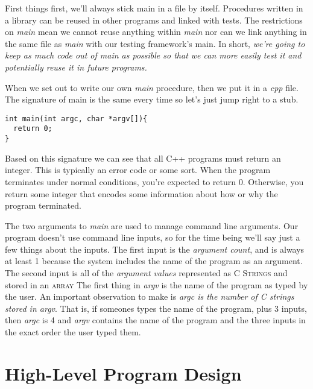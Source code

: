 \documentclass[]{tufte-handout}
\begin{document}
First things first, we'll always stick main in a file by itself. Procedures written in a library can be reused in other programs and linked with tests.  The restrictions on \textit{main} mean we cannot reuse anything within \textit{main} nor can we link anything in the same file as \textit{main} with our testing framework's main.  In short, \textit{we're going to keep as much code out of main as possible so that we can more easily test it and potentially reuse it in future programs.}

When we set out to write our own \textit{main} procedure, then we put it in a \textit{cpp} file.  The signature of main is the same every time so let's just jump right to a stub.

\begin{verbatim}
int main(int argc, char *argv[]){
  return 0;
}
\end{verbatim}

Based on this signature we can see that all C++ programs must return an integer. This is typically an error code or some sort. When the program terminates under normal conditions, you're expected to return 0. Otherwise, you return some integer that encodes some information about how or why the program terminated. 

The two arguments to \textit{main} are used to manage command line arguments.  Our program doesn't use command line inputs, so for the time being we'll say just a few things about the inputs. The first input is the \textit{argument count}, and is always at least 1 because the system includes the name of the program as an argument.  The second input is all of the \textit{argument values} represented as \textsc{C Strings} and stored in an \textsc{array} The first thing in \textit{argv} is the name of the program as typed by the user.  An important observation to make is \textit{argc is the number of C strings stored in argv}.  That is, if someones types the name of the program, plus 3 inputs, then \textit{argc} is 4 and \textit{argv} contains the name of the program and the three inputs in the exact order the user typed them.

\section{High-Level Program Design}
\end{document}
